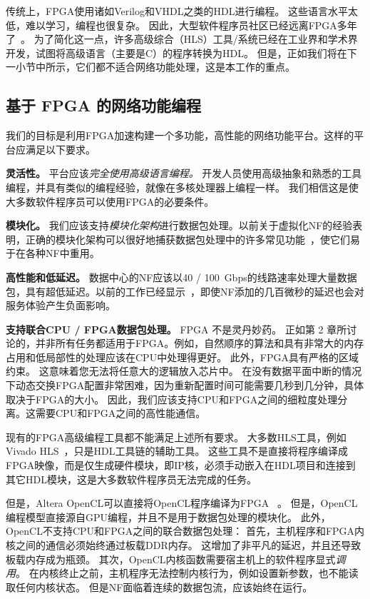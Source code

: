 传统上，FPGA使用诸如Verilog和VHDL之类的HDL进行编程。
这些语言水平太低，难以学习，编程也很复杂。
因此，大型软件程序员社区已经远离FPGA多年了~\cite {bacon2013fpga}。
为了简化这一点，许多高级综合（HLS）工具/系统已经在工业界和学术界开发，试图将高级语言（主要是C）的程序转换为HDL。
但是，正如我们将在下一小节中所示，它们都不适合网络功能处理，这是本工作的重点。

\subsection{基于 FPGA 的网络功能编程}

我们的目标是利用FPGA加速构建一个多功能，高性能的网络功能平台。这样的平台应满足以下要求。

\textbf {灵活性。} 平台应该\textit {完全使用高级语言编程。}
开发人员使用高级抽象和熟悉的工具编程，并具有类似的编程经验，就像在多核处理器上编程一样。
我们相信这是使大多数软件程序员可以使用FPGA的必要条件。

\textbf {模块化。} 我们应该支持\textit {模块化架构}进行数据包处理。以前关于虚拟化NF的经验表明，正确的模块化架构可以很好地捕获数据包处理中的许多常见功能~\cite {kohler2000click,martins2014clickos}，使它们易于在各种NF中重用。

\textbf {高性能和低延迟。} 数据中心的NF应该以40 / 100~Gbps的线路速率处理大量数据包，具有超低延迟。以前的工作已经显示~\cite {rollback-mb}，即使NF添加的几百微秒的延迟也会对服务体验产生负面影响。

\textbf {支持联合CPU / FPGA数据包处理。} FPGA 不是灵丹妙药。
正如第 2 章所讨论的，并非所有任务都适用于FPGA。例如，自然顺序的算法和具有非常大的内存占用和低局部性的处理应该在CPU中处理得更好。
此外，FPGA具有严格的区域约束。
这意味着您无法将任意大的逻辑放入芯片中。
在没有数据平面中断的情况下动态交换FPGA配置非常困难，因为重新配置时间可能需要几秒到几分钟，具体取决于FPGA的大小。
因此，我们应该支持CPU和FPGA之间的细粒度处理分离。这需要CPU和FPGA之间的高性能通信。


现有的FPGA高级编程工具都不能满足上述所有要求。
大多数HLS工具，例如 Vivado HLS~\cite{vivado}，只是HDL工具链的辅助工具。
这些工具不是直接将程序编译成FPGA映像，而是仅生成硬件模块，即IP核，必须手动嵌入在HDL项目和连接到其它HDL模块，这是大多数软件程序员无法完成的任务。

但是，Altera OpenCL可以直接将OpenCL程序编译为FPGA~ \cite {aoc}。
但是，OpenCL编程模型直接源自GPU编程，并且不是用于数据包处理的模块化。
此外，OpenCL不支持CPU和FPGA之间的联合数据包处理：
首先，主机程序和FPGA内核之间的通信必须始终通过板载DDR内存。 这增加了非平凡的延迟，并且还导致板载内存成为瓶颈。
其次，OpenCL内核函数需要宿主机上的软件程序显式\textit {调用}。
在内核终止之前，主机程序无法控制内核行为，例如设置新参数，也不能读取任何内核状态。
但是NF面临着连续的数据包流，应该始终在运行。

